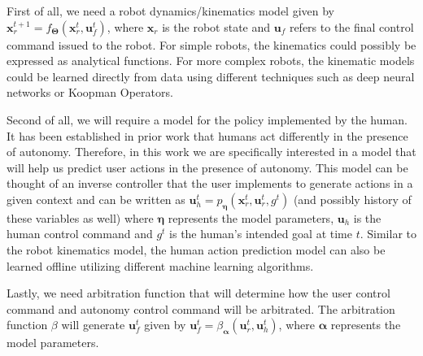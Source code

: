 \documentclass[12pt]{article}
\begin{document}
First of all, we need a robot dynamics/kinematics model given by $\boldsymbol{x}_r^{t+1} = f_{\boldsymbol{\Theta}}(\boldsymbol{x}_r^{t}, \boldsymbol{u}_f^{t})$, where $\boldsymbol{x}_r$ is the robot state and $\boldsymbol{u}_f$ refers to the final control command issued to the robot. For simple robots, the kinematics could possibly be expressed as analytical functions. For more complex robots, the kinematic models could be learned directly from data using different techniques such as deep neural networks or Koopman Operators. 

Second of all, we will require a model for the policy implemented by the human. It has been established in prior work that humans act differently in the presence of autonomy. Therefore, in this work we are specifically interested in a model that will help us predict user actions in the presence of autonomy. This model can be thought of an inverse controller that the user implements to generate actions in a given context and can be written as $\boldsymbol{u}_h^{t} = p_{\boldsymbol{\eta}}(\boldsymbol{x}_r^{t}, \boldsymbol{u}_r^{t}, g^t)$ (and possibly history of these variables as well) where $\boldsymbol{\eta}$ represents the model parameters, $\boldsymbol{u}_h$ is the human control command and $g^t$ is the human's intended goal at time $t$. Similar to the robot kinematics model, the human action prediction model can also be learned offline utilizing different machine learning algorithms.

Lastly, we need arbitration function that will determine how the user control command and autonomy control command will be arbitrated. The arbitration function $\beta$ will generate $\boldsymbol{u}_f^{t}$ given by $\boldsymbol{u}_f^{t} = \beta_{\boldsymbol{\alpha}}(\boldsymbol{u}_r^{t}, \boldsymbol{u}_h^{t})$, where $\boldsymbol{\alpha}$ represents the model parameters. 
%
%
%
\end{document}

